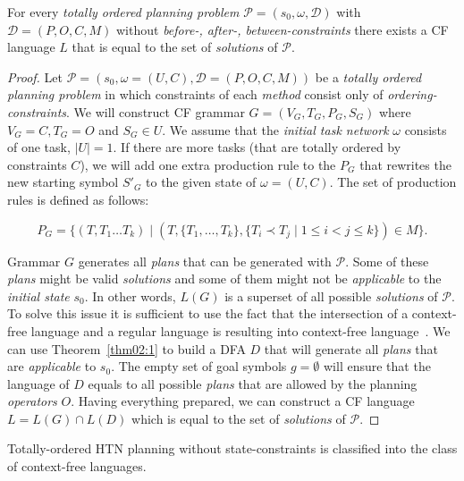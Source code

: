 \begin{thm}\label{thm02:4}
    For every \emph{totally ordered planning problem} $\mathcal{P} = (s_0,\omega,\mathcal{D})$ with $\mathcal{D}=(P, O, C, M)$ without \emph{before-, after-, between-constraints} there exists a CF language $L$ that is equal to the set of \emph{solutions} of $\mathcal{P}$.
\end{thm}
\begin{proof}
    Let $\mathcal{P} = (s_0,\omega = (U, C), \mathcal{D} = (P, O, C, M))$ be a \emph{totally ordered planning problem} in which constraints of each \emph{method} consist only of \emph{ordering-constraints}. We will construct CF grammar $G = (V_G, T_G, P_G, S_G)$ where $V_G = C, T_G = O$ and $S_G \in U$. We assume that the \emph{initial task network} $\omega$ consists of one task, $|U| = 1$. If there are more tasks (that are totally ordered by constraints $C$), we will add one extra production rule to the $P_G$ that rewrites the new starting symbol $S'_G$ to the given state of $\omega = (U, C)$. The set of production rules is defined as follows:
    
    \[
    P_G = \{(T, T_1\dots T_k) \; | \; (T, \{T_1, \dots, T_k\}, \{T_i \prec T_j \; | \; 1 \leq i < j \leq k\}) \in M\}.
    \]

    Grammar $G$ generates all \emph{plans} that can be generated with $\mathcal{P}$. Some of these \emph{plans} might be valid \emph{solutions} and some of them might not be \emph{applicable} to the \emph{initial state} $s_0$. In other words, $L(G)$ is a superset of all possible \emph{solutions} of $\mathcal{P}$. To solve this issue it is sufficient to use the fact that the intersection of a context-free language and a regular language is resulting into context-free language~\cite{chytil}. We can use Theorem~\ref{thm02:1} to build a DFA $D$ that will generate all \emph{plans} that are \emph{applicable} to $s_0$. The empty set of goal symbols $g = \emptyset$ will ensure that the language of $D$ equals to all possible \emph{plans} that are allowed by the planning \emph{operators} $O$. Having everything prepared, we can construct a CF language $L = L(G) \cap L(D)$ which is equal to the set of \emph{solutions} of $\mathcal{P}$.
\end{proof}

\begin{cor}\label{cor2:2}
Totally-ordered HTN planning without state-constraints is classified into the class of context-free languages.
\end{cor}

